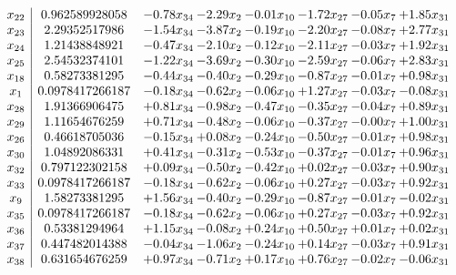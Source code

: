 \documentclass[8pt]{article}
\begin{document}
\[\begin{array}{c| c c@{\hskip 2pt} c@{\hskip 2pt} c@{\hskip 2pt} c@{\hskip 2pt} c@{\hskip 2pt} c@{\hskip 2pt} }
 x_{22}   &  0.962589928058 & -0.78 x_{34} & -2.29 x_{2} & -0.01 x_{10} & -1.72 x_{27} & -0.05 x_{7} & +  1.85 x_{31}\\
 x_{23}   &  2.29352517986 & -1.54 x_{34} & -3.87 x_{2} & -0.19 x_{10} & -2.20 x_{27} & -0.08 x_{7} & +  2.77 x_{31}\\
 x_{24}   &  1.21438848921 & -0.47 x_{34} & -2.10 x_{2} & -0.12 x_{10} & -2.11 x_{27} & -0.03 x_{7} & +  1.92 x_{31}\\
 x_{25}   &  2.54532374101 & -1.22 x_{34} & -3.69 x_{2} & -0.30 x_{10} & -2.59 x_{27} & -0.06 x_{7} & +  2.83 x_{31}\\
 x_{18}   &  0.58273381295 & -0.44 x_{34} & -0.40 x_{2} & -0.29 x_{10} & -0.87 x_{27} & -0.01 x_{7} & +  0.98 x_{31}\\
 x_{1}   &  0.0978417266187 & -0.18 x_{34} & -0.62 x_{2} & -0.06 x_{10} & +  1.27 x_{27} & -0.03 x_{7} & -0.08 x_{31}\\
 x_{28}   &  1.91366906475 & +  0.81 x_{34} & -0.98 x_{2} & -0.47 x_{10} & -0.35 x_{27} & -0.04 x_{7} & +  0.89 x_{31}\\
 x_{29}   &  1.11654676259 & +  0.71 x_{34} & -0.48 x_{2} & -0.06 x_{10} & -0.37 x_{27} & -0.00 x_{7} & +  1.00 x_{31}\\
 x_{26}   &  0.46618705036 & -0.15 x_{34} & +  0.08 x_{2} & -0.24 x_{10} & -0.50 x_{27} & -0.01 x_{7} & +  0.98 x_{31}\\
 x_{30}   &  1.04892086331 & +  0.41 x_{34} & -0.31 x_{2} & -0.53 x_{10} & -0.37 x_{27} & -0.01 x_{7} & +  0.96 x_{31}\\
 x_{32}   &  0.797122302158 & +  0.09 x_{34} & -0.50 x_{2} & -0.42 x_{10} & +  0.02 x_{27} & -0.03 x_{7} & +  0.90 x_{31}\\
 x_{33}   &  0.0978417266187 & -0.18 x_{34} & -0.62 x_{2} & -0.06 x_{10} & +  0.27 x_{27} & -0.03 x_{7} & +  0.92 x_{31}\\
 x_{9}   &  1.58273381295 & +  1.56 x_{34} & -0.40 x_{2} & -0.29 x_{10} & -0.87 x_{27} & -0.01 x_{7} & -0.02 x_{31}\\
 x_{35}   &  0.0978417266187 & -0.18 x_{34} & -0.62 x_{2} & -0.06 x_{10} & +  0.27 x_{27} & -0.03 x_{7} & +  0.92 x_{31}\\
 x_{36}   &  0.53381294964 & +  1.15 x_{34} & -0.08 x_{2} & +  0.24 x_{10} & +  0.50 x_{27} & +  0.01 x_{7} & +  0.02 x_{31}\\
 x_{37}   &  0.447482014388 & -0.04 x_{34} & -1.06 x_{2} & -0.24 x_{10} & +  0.14 x_{27} & -0.03 x_{7} & +  0.91 x_{31}\\
 x_{38}   &  0.631654676259 & +  0.97 x_{34} & -0.71 x_{2} & +  0.17 x_{10} & +  0.76 x_{27} & -0.02 x_{7} & -0.06 x_{31}\\

\end{array}\]
\end{document}
